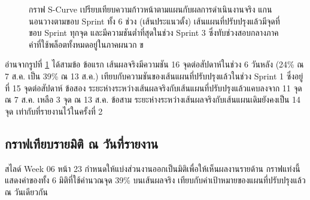 \begin{figure}[!ht]
\caption{กราฟ S-Curve เปรียบเทียบความก้าวหน้าตามแผนกับผลการดำเนินงานจริง
  แกนนอนวางตามขอบ Sprint ทั้ง 6 ช่วง (เส้นประแนวตั้ง)
  เส้นแผนที่ปรับปรุงแล้วมีจุดที่ขอบ Sprint ทุกจุด และมีความชันต่ำที่สุดในช่วง Sprint 3 ซึ่งทับช่วงสอบกลางภาค
  ค่าที่ใช้พล็อตทั้งหมดอยู่ในภาคผนวก ข}
\label{fig:scurve}
\end{figure}

\noindent อ่านจากรูปที่ \ref{fig:scurve} ได้สามข้อ ข้อแรก เส้นผลจริงมีความชัน 16 จุดต่อสัปดาห์ในช่วง 6 วันหลัง (24\% ณ 7 ส.ค. เป็น 39\% ณ 13 ส.ค.) เทียบกับความชันของเส้นแผนที่ปรับปรุงแล้วในช่วง Sprint 1 ซึ่งอยู่ที่ 15 จุดต่อสัปดาห์ ข้อสอง ระยะห่างระหว่างเส้นผลจริงกับเส้นแผนที่ปรับปรุงแล้วแคบลงจาก 11 จุด ณ 7 ส.ค. เหลือ 3 จุด ณ 13 ส.ค. ข้อสาม ระยะห่างระหว่างเส้นผลจริงกับเส้นแผนเดิมยังคงเป็น 14 จุด เท่ากับที่รายงานไว้ในครั้งที่ 2

\clearpage
\subsection{กราฟเทียบรายมิติ ณ วันที่รายงาน}

สไลด์ Week 06 หน้า 23 กำหนดให้แบ่งส่วนงานออกเป็นมิติเพื่อให้เห็นผลงานรายด้าน กราฟแท่งนี้แสดงค่าของทั้ง 6 มิติที่ใช้คำนวณจุด 39\% บนเส้นผลจริง เทียบกับค่าเป้าหมายของแผนที่ปรับปรุงแล้ว ณ วันเดียวกัน

